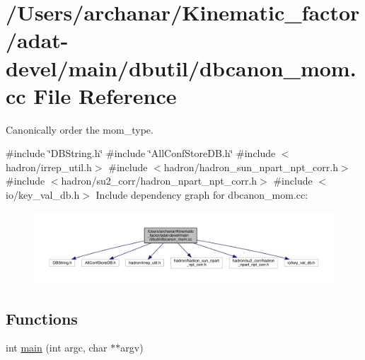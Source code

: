 \hypertarget{adat-devel_2main_2dbutil_2dbcanon__mom_8cc}{}\section{/\+Users/archanar/\+Kinematic\+\_\+factor/adat-\/devel/main/dbutil/dbcanon\+\_\+mom.cc File Reference}
\label{adat-devel_2main_2dbutil_2dbcanon__mom_8cc}


Canonically order the mom\+\_\+type.  


{\ttfamily \#include \char`\"{}D\+B\+String.\+h\char`\"{}}\newline
{\ttfamily \#include \char`\"{}All\+Conf\+Store\+D\+B.\+h\char`\"{}}\newline
{\ttfamily \#include $<$hadron/irrep\+\_\+util.\+h$>$}\newline
{\ttfamily \#include $<$hadron/hadron\+\_\+sun\+\_\+npart\+\_\+npt\+\_\+corr.\+h$>$}\newline
{\ttfamily \#include $<$hadron/su2\+\_\+corr/hadron\+\_\+npart\+\_\+npt\+\_\+corr.\+h$>$}\newline
{\ttfamily \#include $<$io/key\+\_\+val\+\_\+db.\+h$>$}\newline
Include dependency graph for dbcanon\+\_\+mom.\+cc\+:
\nopagebreak
\begin{figure}[H]
\begin{center}
\leavevmode
\includegraphics[width=350pt]{df/d2b/adat-devel_2main_2dbutil_2dbcanon__mom_8cc__incl}
\end{center}
\end{figure}
\subsection*{Functions}
\begin{DoxyCompactItemize}
\item 
int \mbox{\hyperlink{adat-devel_2main_2dbutil_2dbcanon__mom_8cc_a3c04138a5bfe5d72780bb7e82a18e627}{main}} (int argc, char $\ast$$\ast$argv)
\end{DoxyCompactItemize}



